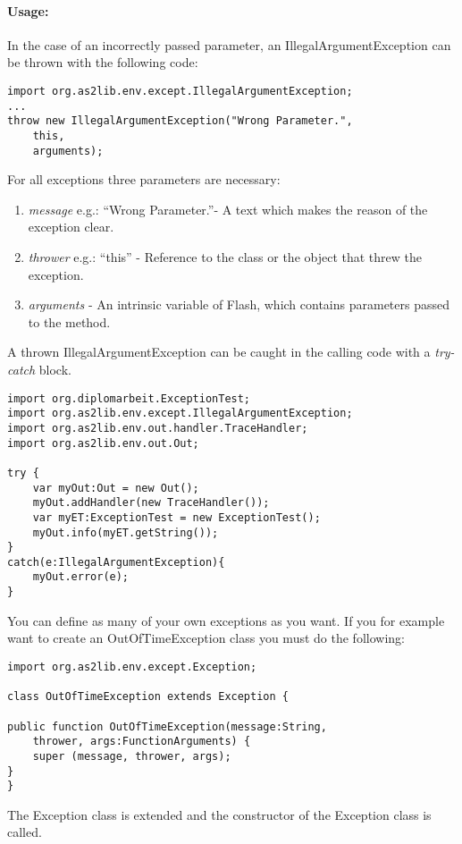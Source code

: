 \paragraph{Usage:}

In the case of an incorrectly passed parameter, an IllegalArgumentException can be thrown with the following code:

\begin{lstlisting}[frame=single]
import org.as2lib.env.except.IllegalArgumentException;
...
throw new IllegalArgumentException("Wrong Parameter.",
	this,
	arguments);
\end{lstlisting}
For all exceptions three parameters are necessary:
\begin{enumerate}
	\item \emph{message} e.g.: ``Wrong Parameter.''- A text which makes the reason of the exception clear.
	\item \emph{thrower} e.g.: ``this'' - Reference to the class or the object that threw the exception.
	\item \emph{arguments} - An intrinsic variable of Flash, which contains parameters passed to the method.
\end{enumerate}
A thrown IllegalArgumentException can be caught in the calling code with a \emph{try-catch} block.
\begin{lstlisting}[frame=single]
import org.diplomarbeit.ExceptionTest;
import org.as2lib.env.except.IllegalArgumentException;
import org.as2lib.env.out.handler.TraceHandler;
import org.as2lib.env.out.Out;

try {
	var myOut:Out = new Out();
	myOut.addHandler(new TraceHandler());
	var myET:ExceptionTest = new ExceptionTest();
	myOut.info(myET.getString());
}
catch(e:IllegalArgumentException){
	myOut.error(e);
}
\end{lstlisting}

You can define as many of your own exceptions as you want. If you for example want to create an OutOfTimeException class you must do the following:
\clearpage
\begin{lstlisting}[frame=single]
import org.as2lib.env.except.Exception;

class OutOfTimeException extends Exception {

public function OutOfTimeException(message:String,
	thrower, args:FunctionArguments) {
	super (message, thrower, args);
}
}
\end{lstlisting}
The Exception class is extended and the constructor of the Exception class is called.